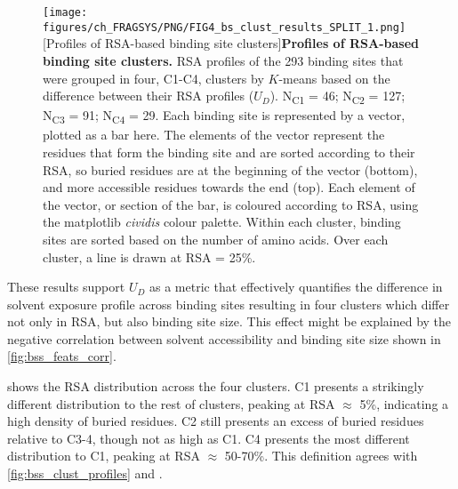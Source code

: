 \begin{figure}[htb!]
    \centering
    \texttt{[image: figures/ch\_FRAGSYS/PNG/FIG4\_bs\_clust\_results\_SPLIT\_1.png]}
    [Profiles of RSA-based binding site clusters]{\textbf{Profiles of RSA-based binding site clusters.} RSA profiles of the 293 binding sites that were grouped in four, C1-C4, clusters by $K$-means based on the difference between their RSA profiles ($U_{D}$). N\textsubscript{C1} = 46; N\textsubscript{C2} = 127; N\textsubscript{C3} = 91; N\textsubscript{C4} = 29. Each binding site is represented by a vector, plotted as a bar here. The elements of the vector represent the residues that form the binding site and are sorted according to their RSA, so buried residues are at the beginning of the vector (bottom), and more accessible residues towards the end (top). Each element of the vector, or section of the bar, is coloured according to RSA, using the matplotlib  \textit{cividis} colour palette. Within each cluster, binding sites are sorted based on the number of amino acids. Over each cluster, a line is drawn at RSA = 25\%.}
\label{fig:bss_clust_profiles}
\end{figure}

These results support $U_{D}$ as a metric that effectively quantifies the difference in solvent exposure profile across binding sites resulting in four clusters which differ not only in RSA, but also binding site size. This effect might be explained by the negative correlation between solvent accessibility and binding site size shown in \autoref{fig:bss_feats_corr}.

 shows the RSA distribution across the four clusters. C1 presents a strikingly different distribution to the rest of clusters, peaking at RSA $\approx$ 5\%, indicating a high density of buried residues. C2 still presents an excess of buried residues relative to  C3-4, though not as high as C1. C4 presents the most different distribution to C1, peaking at RSA $\approx$ 50-70\%. This definition agrees with \autoref{fig:bss_clust_profiles} and  . 

